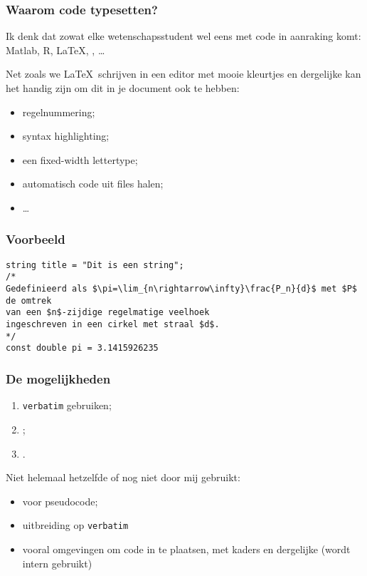 \begin{frame}
  \frametitle{Waarom code typesetten?}

  Ik denk dat zowat elke wetenschapsstudent wel eens met code in aanraking komt: Matlab, R, \LaTeX, \cpp, \ldots

  Net zoals we \LaTeX\ schrijven in een editor met mooie kleurtjes en dergelijke kan het handig zijn om dit in je document ook te hebben:
  \begin{itemize}
    \item regelnummering;
    \item syntax highlighting;
    \item een fixed-width lettertype;
    \item automatisch code uit files halen;
    \item \ldots
  \end{itemize}
\end{frame}

\begin{frame}[fragile]
  \frametitle{Voorbeeld}

\begin{verbatim}
string title = "Dit is een string";
/*
Gedefinieerd als $\pi=\lim_{n\rightarrow\infty}\frac{P_n}{d}$ met $P$ de omtrek
van een $n$-zijdige regelmatige veelhoek
ingeschreven in een cirkel met straal $d$.
*/
const double pi = 3.1415926235
\end{verbatim}
\end{frame}

\begin{frame}[fragile]
  \frametitle{De mogelijkheden}

  \begin{enumerate}
    \item \verb|verbatim| gebruiken;
    \item {};
    \item {}.
  \end{enumerate}

  Niet helemaal hetzelfde of nog niet door mij gebruikt:
  \begin{itemize}
    \item {} voor pseudocode;
    \item {} uitbreiding op \verb|verbatim|
    \item {} vooral omgevingen om code in te plaatsen, met kaders en dergelijke (wordt intern gebruikt)
  \end{itemize}
\end{frame}

